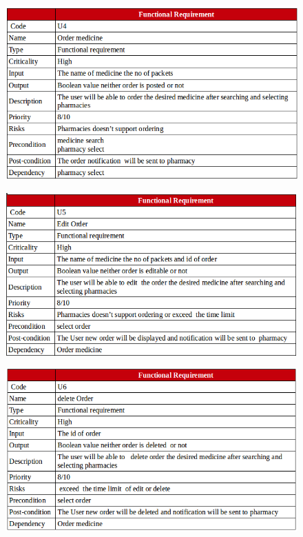 \documentclass[]{article}
\begin{document}
\begin{figure}[H]
\centering
\includegraphics[scale=0.4]{./f/18}
\end{figure}

\begin{figure}[H]
\centering
\includegraphics[scale=0.4]{./f/19}
\end{figure}

\begin{figure}[H]
\centering
\includegraphics[scale=0.4]{./f/20}
\end{figure}
\end{document}

